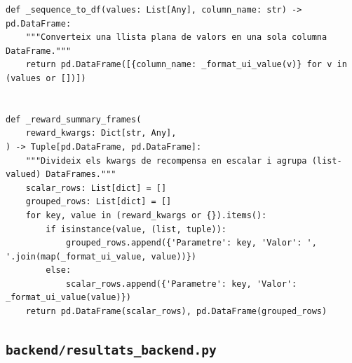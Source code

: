 \documentclass[10pt,a4paper]{article}
\begin{document}
\begin{lstlisting}[style=studioPython,caption={backend/mostrar\_entorn\_backend.py},label={lst:backend-mostrar-entorn-backend-py}]
def _sequence_to_df(values: List[Any], column_name: str) -> pd.DataFrame:
    """Converteix una llista plana de valors en una sola columna DataFrame."""
    return pd.DataFrame([{column_name: _format_ui_value(v)} for v in (values or [])])


def _reward_summary_frames(
    reward_kwargs: Dict[str, Any],
) -> Tuple[pd.DataFrame, pd.DataFrame]:
    """Divideix els kwargs de recompensa en escalar i agrupa (list-valued) DataFrames."""
    scalar_rows: List[dict] = []
    grouped_rows: List[dict] = []
    for key, value in (reward_kwargs or {}).items():
        if isinstance(value, (list, tuple)):
            grouped_rows.append({'Parametre': key, 'Valor': ', '.join(map(_format_ui_value, value))})
        else:
            scalar_rows.append({'Parametre': key, 'Valor': _format_ui_value(value)})
    return pd.DataFrame(scalar_rows), pd.DataFrame(grouped_rows)
\end{lstlisting}


\subsection{\texorpdfstring{\texttt{backend/resultats\_backend.py}}{backend/resultats\_backend.py}}
\end{document}
